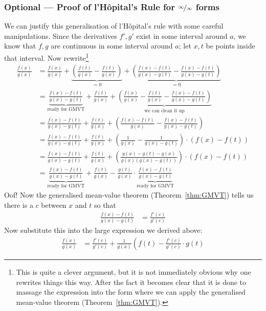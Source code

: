 \begin{enumerate}[(a)]
\subsubsection*{Optional --- Proof of l'H\^opital's Rule for $\nicefrac\infty\infty$
forms}
We can justify this generalisation of l'H\^opital's rule with some careful manipulations.
Since the derivatives $f',g'$ exist in some interval around $a$, we know that $f,g$ are
continuous in some interval around $a$; let $x,t$ be points inside that interval. Now
rewrite\footnote{This is quite a clever argument, but it is not immediately obvious why
one rewrites things this way. After the fact it becomes clear that it is done to
massage the expression into the form where we can apply the generalised mean-value theorem
(Theorem~\ref{thm:GMVT}). }
\begin{align*}
  \frac{f(x)}{g(x)}
  &= \frac{f(x)}{g(x)}
  +\underbrace{\left( \frac{f(t)}{g(x)} - \frac{f(t)}{g(x)}\right)}_{=0}
  + \underbrace{\left(\frac{f(x)-f(t)}{g(x)-g(t)}
  - \frac{f(x)-f(t)}{g(x)-g(t)}\right)}_{=0} \\
  &= \underbrace{\frac{f(x)-f(t)}{g(x)-g(t)}}_\text{ready for GMVT}
  + \frac{f(t)}{g(x)}
  + \underbrace{\left(
  \frac{f(x)}{g(x)} - \frac{f(t)}{g(x)} - \frac{f(x)-f(t)}{g(x)-g(t)}
  \right)}_\text{we can clean it up}\\
%
  &= \frac{f(x)-f(t)}{g(x)-g(t)}
  + \frac{f(t)}{g(x)}
  + \left(
  \frac{f(x)-f(t)}{g(x)} - \frac{f(x)-f(t)}{g(x)-g(t)}
  \right)\\
%
  &= \frac{f(x)-f(t)}{g(x)-g(t)}
  + \frac{f(t)}{g(x)}
  + \left(
  \frac{1}{g(x)} - \frac{1}{g(x)-g(t)}
  \right)\cdot (f(x)-f(t))\\
%
  &= \frac{f(x)-f(t)}{g(x)-g(t)}
  + \frac{f(t)}{g(x)}
  + \left(
  \frac{g(x)-g(t) - g(x)}{g(x)(g(x)-g(t))}
  \right)\cdot (f(x)-f(t))\\
%
  &= \underbrace{\frac{f(x)-f(t)}{g(x)-g(t)}}_\text{ready for GMVT}
  + \frac{f(t)}{g(x)}
  - \frac{g(t)}{g(x)}\cdot \underbrace{\frac{f(x)-f(t)}{g(x)-g(t)}}_\text{ready for GMVT}
\end{align*}
Oof! Now the generalised mean-value theorem (Theorem~\ref{thm:GMVT}) tells us there is a
$c$ between $x$ and $t$ so that
\begin{align*}
  \frac{f(x)-f(t)}{g(x)-g(t)} &= \frac{f'(c)}{g'(c)}
\end{align*}
Now substitute this into the large expression we derived above:
\begin{align*}
  \frac{f(x)}{g(x)}
  &= \frac{f'(c)}{g'(c)} + \frac{1}{g(x)}\left(f(t) - \frac{f'(c)}{g'(c)}\cdot g(t)

\end{align*}
\end{enumerate}
